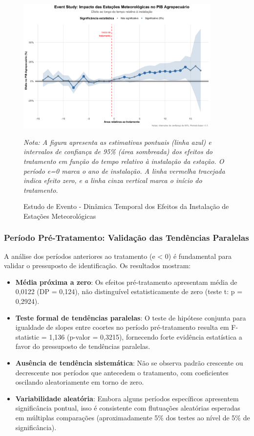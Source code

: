 \documentclass[
	12pt,				%
	oneside,			%
	a4paper,			%
	english,			%
	french,				%
	spanish,			%
	brazil				%
	]{abntex2}
\begin{document}
\begin{figure}[htbp]
\centering
\caption{Estudo de Evento - Dinâmica Temporal dos Efeitos da Instalação de Estações Meteorológicas}
\label{fig:eventstudy}
\includegraphics[width=0.9\textwidth]{../../../data/outputs/presentation/event_study_enhanced.png}

\textit{Nota: A figura apresenta as estimativas pontuais (linha azul) e intervalos de confiança de 95\% (área sombreada) dos efeitos do tratamento em função do tempo relativo à instalação da estação. O período e=0 marca o ano de instalação. A linha vermelha tracejada indica efeito zero, e a linha cinza vertical marca o início do tratamento.}
\end{figure}

\subsubsection{Período Pré-Tratamento: Validação das Tendências Paralelas}

A análise dos períodos anteriores ao tratamento (e < 0) é fundamental para validar o pressuposto de identificação. Os resultados mostram:

\begin{itemize}
\item \textbf{Média próxima a zero}: Os efeitos pré-tratamento apresentam média de 0,0122 (DP = 0,124), não distinguível estatisticamente de zero (teste t: p = 0,2924).

\item \textbf{Teste formal de tendências paralelas}: O teste de hipótese conjunta para igualdade de slopes entre coortes no período pré-tratamento resulta em F-statistic = 1,136 (p-valor = 0,3215), fornecendo forte evidência estatística a favor do pressuposto de tendências paralelas.

\item \textbf{Ausência de tendência sistemática}: Não se observa padrão crescente ou decrescente nos períodos que antecedem o tratamento, com coeficientes oscilando aleatoriamente em torno de zero.

\item \textbf{Variabilidade aleatória}: Embora alguns períodos específicos apresentem significância pontual, isso é consistente com flutuações aleatórias esperadas em múltiplas comparações (aproximadamente 5\% dos testes ao nível de 5\% de significância).
\end{itemize}
\end{document}
